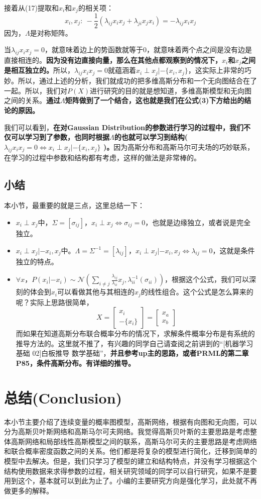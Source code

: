 \documentclass[a4paper]{article}
\begin{document}
接着从(17)提取和$x_i$和$x_j$的相关项：
\begin{equation}
    x_i,x_j:\ -\frac{1}{2} (\lambda_{ij}x_ix_j + \lambda_{ji}x_jx_i) = -\lambda_{ij}x_ix_j 
\end{equation}
因为，$\Lambda$是对称矩阵。

当$\lambda_{ij}x_ix_j=0$，就意味着边上的势函数就等于0，就意味着两个点之间是没有边是直接相连的。\textbf{因为没有边直接向量，那么在其他点都观察到的情况下，$x_i$和$x_j$之间是相互独立的。}所以，$\lambda_{ij}x_ix_j=0$就蕴涵着$x_i\perp x_j|-\{x_i,x_j\}$，这实际上非常的巧妙。所以，通过上述的分析，我们就成功的把多维高斯分布和一个无向图结合在了一起。所以，我们对$P(X)$进行研究的目的就是想知道，多维高斯模型和无向图之间的关系。\textbf{通过$\Lambda$矩阵做到了一个结合，这也就是我们在公式(3)下方给出的结论的原因。}

我们可以看到，\textbf{在对Gaussian Distribution的参数进行学习的过程中，我们不仅可以学习到了参数，也同时根据$\Lambda$的也就可以学习到结构($\lambda_{ij}x_ix_j=0 \Longleftrightarrow x_i\perp x_j|-\{x_i,x_j\}$ )。}因为高斯分布和高斯马尔可夫场的巧妙联系，在学习的过程中参数和结构都有考虑，这样的做法是非常棒的。

\subsection{小结}
本小节，最重要的就是三点，这里总结一下：
\begin{itemize}
    \item $x_i \perp x_j$中，$\Sigma = [\sigma_{ij}]$，$x_i \perp x_j \Longleftrightarrow \sigma_{ij} = 0$，也就是边缘独立，或者说是完全独立。
    \item $x_i \perp x_j|-{x_i,x_j}$中。$\Lambda = \Sigma^{-1} = [\lambda_{ij}]$，$x_i \perp x_j|-{x_i,x_j} \Longleftrightarrow \lambda_{ij}=0 $，这就是条件独立的特点。
    \item $\forall x$，$P(x_i|-{x_i})\sim \mathcal{N}(\sum_{i\neq j}\frac{\lambda_{ij}}{\lambda_{ii}}x_j,\lambda_{ii}^{-1}(\sigma_{ii}) )$，根据这个公式，我们可以深刻的体会到$x_i$可以看做其他与其相连的$x_j$的线性组合。这个公式是怎么算来的呢？实际上思路很简单，
    $$X = \begin{bmatrix} x_i \\ -\{ x_i\} \end{bmatrix}=\begin{bmatrix} x_a \\ { x_b} \end{bmatrix}$$
    而如果在知道高斯分布联合概率分布的情况下，求解条件概率分布是有系统的推导方法的。这里就不推了，有兴趣的同学自己请查阅之前讲到的“[机器学习基础 02]白板推导 数学基础”，\textbf{并且参考up主的思路，或者PRML的第二章P85，条件高斯分布。有详细的推导。}
\end{itemize}

\section{总结(Conclusion)}
本小节主要介绍了连续变量的概率图模型，高斯网络，根据有向图和无向图，可以分为高斯贝叶斯网络和高斯马尔可夫网络。我觉得高斯贝叶斯的主要思路是考虑整体高斯网络和局部线性高斯模型之间的联系，高斯马尔可夫的主要思路是考虑网络和联合概率密度函数之间的关系。他们都是将复杂的模型进行简化，迁移到简单的模型中去解决。但是，我们只学习了模型的建立和结构特点，并没有学习根据这个结构使用数据来求得参数的过程，相关研究领域的同学可以自行研究，如果不是要用到这个，基本就可以到此为止了。小编的主要研究方向是强化学习，此处就不再做更多的解释。
\end{document}
